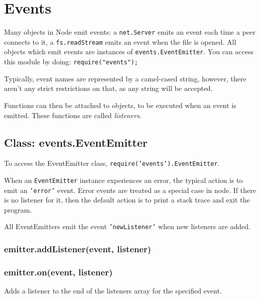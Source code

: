\section{Events}

\begin{Shaded}
\begin{Highlighting}[]
\NormalTok{: } 
\end{Highlighting}
\end{Shaded}

Many objects in Node emit events: a \texttt{net.Server} emits an event
each time a peer connects to it, a \texttt{fs.readStream} emits an event
when the file is opened. All objects which emit events are instances of
\texttt{events.EventEmitter}. You can access this module by doing:
\texttt{require("events");}

Typically, event names are represented by a camel-cased string, however,
there aren't any strict restrictions on that, as any string will be
accepted.

Functions can then be attached to objects, to be executed when an event
is emitted. These functions are called \emph{listeners}.

\subsection{Class: events.EventEmitter}

To access the EventEmitter class,
\texttt{require('events').EventEmitter}.

When an \texttt{EventEmitter} instance experiences an error, the typical
action is to emit an \texttt{'error'} event. Error events are treated as
a special case in node. If there is no listener for it, then the default
action is to print a stack trace and exit the program.

All EventEmitters emit the event \texttt{'newListener'} when new
listeners are added.

\subsubsection{emitter.addListener(event, listener)}

\subsubsection{emitter.on(event, listener)}

Adds a listener to the end of the listeners array for the specified
event.


